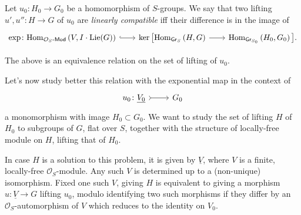 \documentclass[../Main]{subfiles}
\begin{document}
\begin{defn}
	Let $u_0\colon H_0 \to G_0$ be a homomorphism of $S$-groups.
	We say that two lifting $u', u''\colon H \to G$ of $u_0$
	are {\em linearly compatible} iff their difference is in the image
	of 
	\begin{equation*}
	\begin{tikzcd}[row sep = 0ex, column sep = 2.0em
		,/tikz/column 1/.append style={anchor=base east}
		,/tikz/column 2/.append style={anchor=base west}]
		\exp\colon
		\mathrm{Hom}_{ \mathcal{O}_{ S }\text{-}\mathsf{Mod} }
		\left( V, I \cdot \mathrm{Lie}(G) \right)
		\arrow[r, "", hookrightarrow] &
		\ker \big[ 
		\mathrm{Hom}_{ \mathsf{Gr}_S } 
		\left( H, G \right)
		\arrow[r, "", rightarrow] &
		\mathrm{Hom}_{ \mathsf{Gr}_{S_0} }
		\left( H_0, G_0 \right)
		\big]
	.\end{tikzcd}
	\end{equation*} 
\end{defn}


\begin{rem}[]
	The above is an equivalence relation on the set of lifting of $u_0$.
\end{rem}


\noindent
Let's now study better this relation with the exponential map in the context of
\begin{equation*}
\begin{tikzcd}[row sep = 0ex
	,/tikz/column 1/.append style={anchor=base east}
	,/tikz/column 2/.append style={anchor=base west}]
	u_0\colon \underline{V_0} \arrow[r, "", rightarrowtail] &
	G_0
\end{tikzcd}
\end{equation*} 
a monomorphism with image $H_0 \subset G_0$.
We want to study the set of lifting $H$ of $H_0$ to
subgroups of $G$, flat over $S$, together with the structure
of locally-free module on $H$, lifting that of $H_0$.

\begin{rem}\label{rem:EquivalentLiftingSolutions}
	In case $H$ is a solution to this problem, it is given by
	$\underline{V}$, where $V$ is a finite, locally-free $\mathcal{O}_{ S }$-module.
	Any such $V$ is determined up to a (non-unique) isomorphism.
	Fixed one such $V$, giving $H$ is equivalent to giving a morphism
	$u\colon \underline{V} \to G$ lifting $u_0$, modulo identifying
	two such morphisms if they differ by an $\mathcal{O}_{ S }$-automorphism
	of $V$ which reduces to the identity on $V_0$.
\end{rem}
\end{document}
